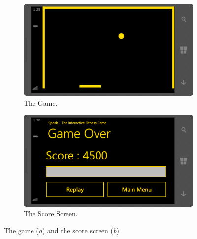 \begin{figure}[H]
	\centering
	\begin{subfigure}[b]{0.4\textwidth}
	\includegraphics[scale = 0.5]{media/prototype/game.png}
	\caption{The Game.}
	\label{figure:thegame}
	\end{subfigure}
	\qquad
	\begin{subfigure}[b]{0.4\textwidth}
	\includegraphics[scale = 0.5]{media/prototype/score-screen.png}
	\caption{The Score Screen.}
	\label{figure:score-screen}
	\end{subfigure}
	\caption{The game (\textit{a}) and the score screen (\textit{b})}
\end{figure}
